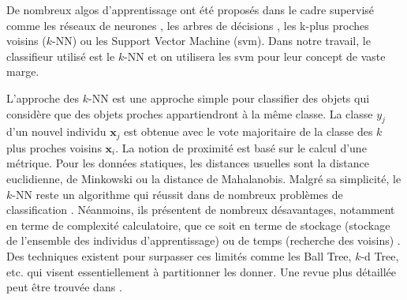 De nombreux algos d'apprentissage ont été proposés dans le cadre supervisé comme les réseaux de neurones \cite{Lee2009}, les arbres de décisions \cite{Quinlan1986a}, les k-plus proches voisins ($k$-NN) ou les Support Vector Machine ({\sc svm}). Dans notre travail, le classifieur utilisé est le $k$-NN et on utilisera les {\sc svm} pour leur concept de vaste marge.

L'approche des $k$-NN \cite{Silverman1989,Cover1967b} est une approche simple pour classifier des objets qui considère que des objets proches appartiendront à la même classe. La classe $y_j$ d'un nouvel individu $\textbf{x}_j$ est obtenue avec le vote majoritaire de la classe des $k$ plus proches voisins $\textbf{x}_i$. La notion de proximité est basé sur le calcul d'une métrique. Pour les données statiques, les distances usuelles sont la distance euclidienne, de Minkowski ou la distance de Mahalanobis. Malgré sa simplicité, le $k$-NN reste un algorithme qui réussit dans de nombreux problèmes de classification \cite{Belongie2002,Xi2006a,Ding2008}. Néanmoins, ils présentent de nombreux désavantages, notamment en terme de complexité calculatoire, que ce soit en terme de stockage (stockage de l'ensemble des individus d'apprentissage) ou de temps (recherche des voisins) \cite{Duda1973}. Des techniques existent pour surpasser ces limités comme les Ball Tree, $k$-d Tree, etc. qui visent essentiellement à partitionner les donner. Une revue plus détaillée peut être trouvée dans \cite{Bhatia2010}.

